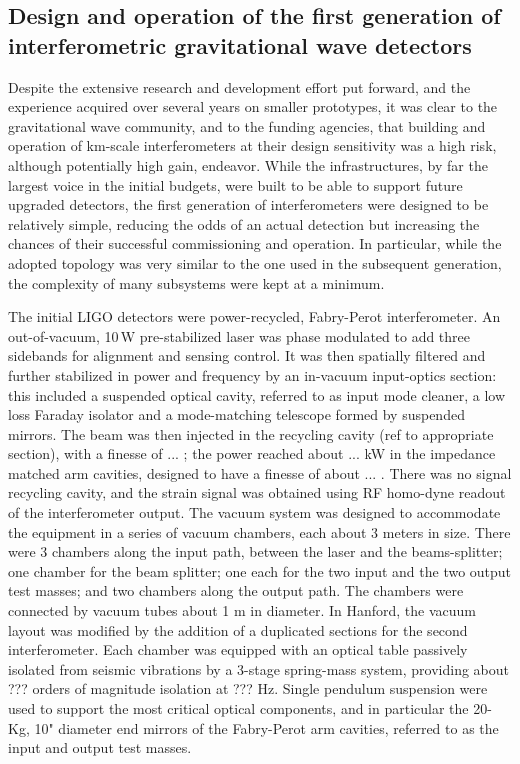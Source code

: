 \subsection{Design and operation of the first generation of interferometric gravitational wave detectors}\label{subsec:1stgen}

Despite the extensive research and development effort put forward, and the experience acquired over several years on smaller prototypes, it was clear to the gravitational wave community, and to the funding agencies, that building and operation of km-scale interferometers at their design sensitivity was a high risk, although potentially high gain, endeavor. While the infrastructures, by far the largest voice in the initial budgets, were built to be able to support future upgraded detectors, the first generation of interferometers were designed to be relatively simple, reducing the odds of an actual detection but increasing the chances of their successful commissioning and operation. In particular, while the adopted topology was very similar to the one used in the subsequent generation, the complexity of many subsystems were kept at a minimum.

The initial LIGO detectors were power-recycled, Fabry-Perot interferometer. An out-of-vacuum, 10\,W pre-stabilized laser was phase modulated to add three sidebands for alignment and sensing control. It was then spatially filtered and further stabilized in power and frequency by an in-vacuum input-optics section: this included a suspended optical cavity, referred to as input mode cleaner, a low loss Faraday isolator and a mode-matching telescope formed by suspended mirrors. The beam was then injected in the recycling cavity (ref to appropriate section), with a finesse of ... ; the power reached about ... kW in the impedance matched arm cavities, designed to have a finesse of about ... . There was no signal recycling cavity, and the strain signal was obtained using RF homo-dyne readout of the interferometer output.
The vacuum system was designed to accommodate the equipment in a series of vacuum chambers, each about 3 meters in size. There were 3 chambers along the input path, between the laser and the beams-splitter; one chamber for the beam splitter; one each for the two input and the two output test masses; and two chambers along the output path. The chambers were connected by vacuum tubes about 1 m in diameter. In Hanford, the vacuum layout was modified by the addition of a duplicated sections for the second interferometer.
Each chamber was equipped with an optical table passively isolated from seismic vibrations by a 3-stage spring-mass system, providing about ??? orders of magnitude isolation at ??? Hz. Single pendulum suspension were used to support the most critical optical components, and in particular the 20-Kg, 10" diameter end mirrors of the Fabry-Perot arm cavities, referred to as the input and output test masses.

